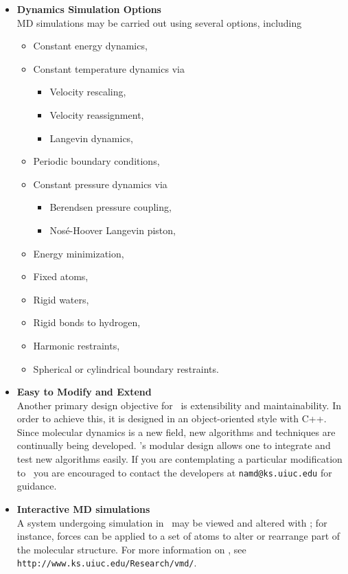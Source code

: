 \begin{itemize}
\item{\bf Dynamics Simulation Options}\\
MD simulations may be carried out using several options, including
\begin{itemize}
  \item Constant energy dynamics,
  \item Constant temperature dynamics via
  \begin{itemize}
    \item Velocity rescaling,
    \item Velocity reassignment,
    \item Langevin dynamics,
  \end{itemize}
  \item Periodic boundary conditions,
  \item Constant pressure dynamics via
  \begin{itemize}
    \item Berendsen pressure coupling,
    \item Nos\'{e}-Hoover Langevin piston,
  \end{itemize}
  \item Energy minimization,
  \item Fixed atoms,
  \item Rigid waters,
  \item Rigid bonds to hydrogen,
  \item Harmonic restraints,
  \item Spherical or cylindrical boundary restraints.
\end{itemize}

\item{\bf Easy to Modify and Extend}\\
Another primary design objective for \NAMD\ is extensibility and 
maintainability. In order to achieve this, it is designed in an 
object-oriented style with C++. Since molecular dynamics is a new field,
new algorithms and techniques are continually being developed.
\NAMD's modular design allows one to integrate and test new algorithms 
easily.  If you are contemplating a particular modification to \NAMD\
you are encouraged to contact the developers at {\tt namd@ks.uiuc.edu}
for guidance.

\item{\bf Interactive MD simulations}\\
A system undergoing simulation in \NAMD\ may be viewed and
altered with \VMD; for instance, forces can be applied to a set of atoms
to alter or rearrange part of the molecular structure.  For more information
on \VMD, see {\tt http://www.ks.uiuc.edu/Research/vmd/}.  


\end{itemize}
